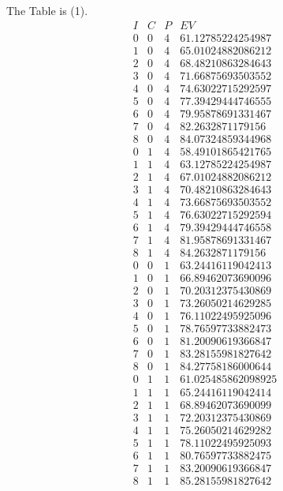 \documentclass{article}
\begin{document}
\begin{enumerate}
  The Table is (1).
  \begin{equation}
    \begin{array}{cccc}
      I & C & P & EV \\
      0 & 0 & 4 & 61.12785224254987 \\
      1 & 0 & 4 & 65.01024882086212 \\
      2 & 0 & 4 & 68.48210863284643 \\
      3 & 0 & 4 & 71.66875693503552 \\
      4 & 0 & 4 & 74.63022715292597 \\
      5 & 0 & 4 & 77.39429444746555 \\
      6 & 0 & 4 & 79.95878691331467 \\
      7 & 0 & 4 & 82.2632871179156 \\
      8 & 0 & 4 & 84.07324859344968 \\
      0 & 1 & 4 & 58.49101865421765 \\
      1 & 1 & 4 & 63.12785224254987 \\
      2 & 1 & 4 & 67.01024882086212 \\
      3 & 1 & 4 & 70.48210863284643 \\
      4 & 1 & 4 & 73.66875693503552 \\
      5 & 1 & 4 & 76.63022715292594 \\
      6 & 1 & 4 & 79.39429444746558 \\
      7 & 1 & 4 & 81.95878691331467 \\
      8 & 1 & 4 & 84.2632871179156 \\
      0 & 0 & 1 & 63.24416119042413 \\
      1 & 0 & 1 & 66.89462073690096 \\
      2 & 0 & 1 & 70.20312375430869 \\
      3 & 0 & 1 & 73.26050214629285 \\
      4 & 0 & 1 & 76.11022495925096 \\
      5 & 0 & 1 & 78.76597733882473 \\
      6 & 0 & 1 & 81.20090619366847 \\
      7 & 0 & 1 & 83.28155981827642 \\
      8 & 0 & 1 & 84.27758186000644 \\
      0 & 1 & 1 & 61.025485862098925 \\
      1 & 1 & 1 & 65.24416119042414 \\
      2 & 1 & 1 & 68.89462073690099 \\
      3 & 1 & 1 & 72.20312375430869 \\
      4 & 1 & 1 & 75.26050214629282 \\
      5 & 1 & 1 & 78.11022495925093 \\
      6 & 1 & 1 & 80.76597733882475 \\
      7 & 1 & 1 & 83.20090619366847 \\
      8 & 1 & 1 & 85.28155981827642 \\
    \end{array}
  \end{equation}


\end{enumerate}
\end{document}
